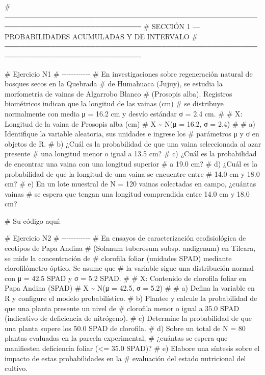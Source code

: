 \documentclass[
  spanish,
  letterpaper,
  DIV=11,
  numbers=noendperiod]{scrreprt}
\newenvironment{Shaded}{\begin{snugshade}}{\end{snugshade}}
\newcommand{\CommentTok}[1]{\textcolor[rgb]{0.37,0.37,0.37}{#1}}
\begin{document}
\begin{Shaded}
\begin{Highlighting}[]
\CommentTok{\# ─────────────────────────────────────────────────────────────────────────────}
\CommentTok{\#  SECCIÓN 1 — PROBABILIDADES ACUMULADAS Y DE INTERVALO}
\CommentTok{\# ─────────────────────────────────────────────────────────────────────────────}

\CommentTok{\# Ejercicio N1}
\CommentTok{\# {-}{-}{-}{-}{-}{-}{-}{-}{-}{-}{-}{-}}
\CommentTok{\# En investigaciones sobre regeneración natural de bosques secos en la Quebrada}
\CommentTok{\# de Humahuaca (Jujuy), se estudia la morfometría de vainas de Algarrobo Blanco}
\CommentTok{\# (Prosopis alba). Registros biométricos indican que la longitud de las vainas (cm)}
\CommentTok{\# se distribuye normalmente con media μ = 16.2 cm y desvío estándar σ = 2.4 cm.}
\CommentTok{\#}
\CommentTok{\#  X: Longitud de la vaina de Prosopis alba (cm)}
\CommentTok{\#  X \textasciitilde{} N(μ = 16.2, σ = 2.4)}
\CommentTok{\#}
\CommentTok{\# a) Identifique la variable aleatoria, sus unidades e ingrese los}
\CommentTok{\#    parámetros μ y σ en objetos de R.}
\CommentTok{\# b) ¿Cuál es la probabilidad de que una vaina seleccionada al azar presente}
\CommentTok{\#    una longitud menor o igual a 13.5 cm?}
\CommentTok{\# c) ¿Cuál es la probabilidad de encontrar una vaina con una longitud superior}
\CommentTok{\#    a 19.0 cm?}
\CommentTok{\# d) ¿Cuál es la probabilidad de que la longitud de una vaina se encuentre entre}
\CommentTok{\#    14.0 cm y 18.0 cm?}
\CommentTok{\# e) En un lote muestral de N = 120 vainas colectadas en campo, ¿cuántas vainas}
\CommentTok{\#    se espera que tengan una longitud comprendida entre 14.0 cm y 18.0 cm?}

\CommentTok{\# Su código aquí:}


\CommentTok{\# Ejercicio N2}
\CommentTok{\# {-}{-}{-}{-}{-}{-}{-}{-}{-}{-}{-}{-}}
\CommentTok{\# En ensayos de caracterización ecofisiológica de ecotipos de Papa Andina}
\CommentTok{\# (Solanum tuberosum subsp. andigenum) en Tilcara, se mide la concentración de}
\CommentTok{\# clorofila foliar (unidades SPAD) mediante clorofilómetro óptico. Se asume que}
\CommentTok{\# la variable sigue una distribución normal con μ = 42.5 SPAD y σ = 5.2 SPAD.}
\CommentTok{\#}
\CommentTok{\#  X: Contenido de clorofila foliar en Papa Andina (SPAD)}
\CommentTok{\#  X \textasciitilde{} N(μ = 42.5, σ = 5.2)}
\CommentTok{\#}
\CommentTok{\# a) Defina la variable en R y configure el modelo probabilístico.}
\CommentTok{\# b) Plantee y calcule la probabilidad de que una planta presente un nivel de}
\CommentTok{\#    clorofila menor o igual a 35.0 SPAD (indicativo de deficiencia de nitrógeno).}
\CommentTok{\# c) Determine la probabilidad de que una planta supere los 50.0 SPAD de clorofila.}
\CommentTok{\# d) Sobre un total de N = 80 plantas evaluadas en la parcela experimental,}
\CommentTok{\#    ¿cuántas se espera que manifiesten deficiencia foliar (\textless{}= 35.0 SPAD)?}
\CommentTok{\# e) Elabore una síntesis sobre el impacto de estas probabilidades en la}
\CommentTok{\#    evaluación del estado nutricional del cultivo.}


\end{Highlighting}
\end{Shaded}
\end{document}
